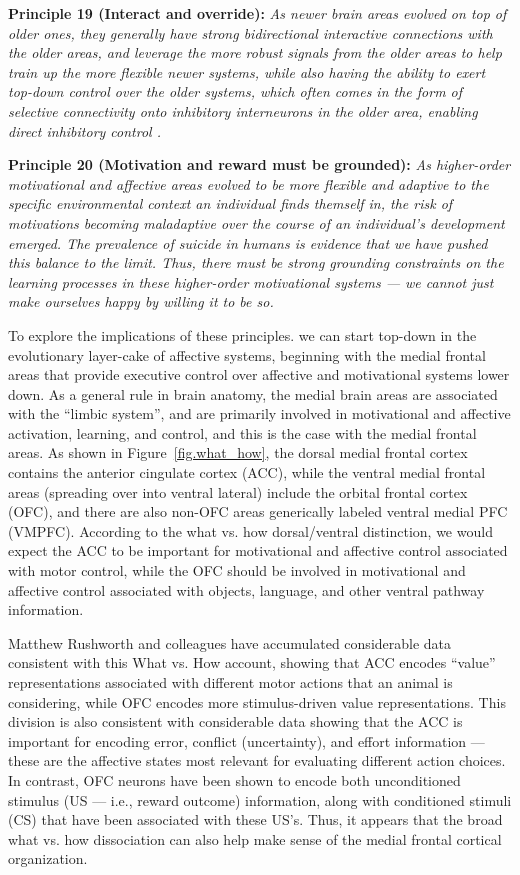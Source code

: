 \documentclass[11pt,twoside]{article}
\begin{document}
{\bf Principle 19 (Interact and override):} {\em As newer brain areas evolved on top of older ones, they generally have strong bidirectional interactive connections with the older areas, and leverage the more robust signals from the older areas to help train up the more flexible newer systems, while also having the ability to exert top-down control over the older systems, which often comes in the form of selective connectivity onto inhibitory interneurons in the older area, enabling direct inhibitory control \cite{MunakataEtAl11}.}

{\bf Principle 20 (Motivation and reward must be grounded):} {\em As higher-order motivational and affective areas evolved to be more flexible and adaptive to the specific environmental context an individual finds themself in, the risk of motivations becoming maladaptive over the course of an individual's development emerged.  The prevalence of suicide in humans is evidence that we have pushed this balance to the limit.  Thus, there must be strong grounding constraints on the learning processes in these higher-order motivational systems --- we cannot just make ourselves happy by willing it to be so.}

To explore the implications of these principles. we can start top-down in the evolutionary layer-cake of affective systems, beginning with the medial frontal areas that provide executive control over affective and motivational systems lower down.  As a general rule in brain anatomy, the medial brain areas are associated with the ``limbic system'', and are primarily involved in motivational and affective activation, learning, and control, and this is the case with the medial frontal areas.  As shown in Figure~\ref{fig.what_how}, the dorsal medial frontal cortex contains the anterior cingulate cortex (ACC), while the ventral medial frontal areas (spreading over into ventral lateral) include the orbital frontal cortex (OFC), and there are also non-OFC areas generically labeled ventral medial PFC (VMPFC).  According to the what vs. how dorsal/ventral distinction, we would expect the ACC to be important for motivational and affective control associated with motor control, while the OFC should be involved in motivational and affective control associated with objects, language, and other ventral pathway information.

Matthew Rushworth and colleagues have accumulated considerable data consistent with this What vs. How account, showing that ACC encodes ``value'' representations associated with different motor actions that an animal is considering, while OFC encodes more stimulus-driven value representations.  This division is also consistent with considerable data showing that the ACC is important for encoding error, conflict (uncertainty), and effort information --- these are the affective states most relevant for evaluating different action choices.  In contrast, OFC neurons have been shown to encode both unconditioned stimulus (US --- i.e., reward outcome) information, along with conditioned stimuli (CS) that have been associated with these US's.  Thus, it appears that the broad what vs. how dissociation can also help make sense of the medial frontal cortical organization.
\end{document}
